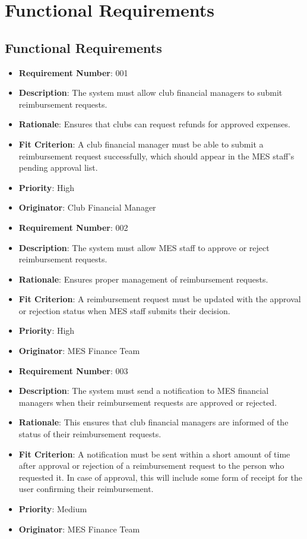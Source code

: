 \documentclass[12pt]{article}
\begin{document}
\section{Functional Requirements}
\subsection{Functional Requirements}

\begin{itemize}

  \item \textbf{Requirement Number}: 001
  \item \textbf{Description}: The system must allow club financial managers to submit reimbursement requests.
  \item \textbf{Rationale}: Ensures that clubs can request refunds for approved expenses.
  \item \textbf{Fit Criterion}: A club financial manager must be able to submit a reimbursement request successfully, which should appear in the MES staff's pending approval list.
  \item \textbf{Priority}: High
  \item \textbf{Originator}: Club Financial Manager
  
  \bigskip

  \item \textbf{Requirement Number}: 002
  \item \textbf{Description}: The system must allow MES staff to approve or reject reimbursement requests.
  \item \textbf{Rationale}: Ensures proper management of reimbursement requests.
  \item \textbf{Fit Criterion}: A reimbursement request must be updated with the approval or rejection status when MES staff submits their decision.
  \item \textbf{Priority}: High
  \item \textbf{Originator}: MES Finance Team

  \bigskip

  \item \textbf{Requirement Number}: 003
  \item \textbf{Description}: The system must send a notification to MES financial managers when their reimbursement requests are approved or rejected.
  \item \textbf{Rationale}: This ensures that club financial managers are informed of the status of their reimbursement requests.
  \item \textbf{Fit Criterion}: A notification must be sent within a short amount of time after approval or rejection of a reimbursement request to the person who requested it. In case of approval, this will include some form of receipt for the user confirming their reimbursement.
  \item \textbf{Priority}: Medium
  \item \textbf{Originator}: MES Finance Team


\end{itemize}
\end{document}
